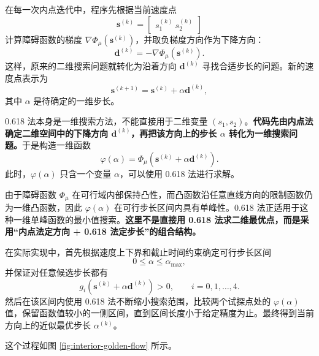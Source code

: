 在每一次内点迭代中，程序先根据当前速度点
\[
	\boldsymbol{s}^{(k)}
	=
	\begin{bmatrix}
		s_1^{(k)}\
		s_2^{(k)}
	\end{bmatrix}
\]
计算障碍函数的梯度 $\nabla \Phi_{\mu}(\boldsymbol{s}^{(k)})$，并取负梯度方向作为下降方向：
\[
	\boldsymbol{d}^{(k)}
	=
	-
	\nabla \Phi_{\mu}(\boldsymbol{s}^{(k)}).
\]
这样，原来的二维搜索问题就转化为沿着方向 $\boldsymbol{d}^{(k)}$ 寻找合适步长的问题。新的速度点表示为
\[
	\boldsymbol{s}^{(k+1)}
	=
	\boldsymbol{s}^{(k)}
	+
	\alpha \boldsymbol{d}^{(k)},
\]
其中 $\alpha$ 是待确定的一维步长。

0.618 法本身是一维搜索方法，不能直接用于二维变量 $(s_1,s_2)$。\textbf{代码先由内点法确定二维空间中的下降方向 $\boldsymbol{d}^{(k)}$，再把该方向上的步长 $\alpha$ 转化为一维搜索问题。}于是构造一维函数
\[
	\varphi(\alpha)
	=
	\Phi_{\mu}
	\left(
	\boldsymbol{s}^{(k)}
	+
	\alpha \boldsymbol{d}^{(k)}
	\right).
\]
此时，$\varphi(\alpha)$ 只含一个变量 $\alpha$，可以使用 0.618 法进行求解。

由于障碍函数 $\Phi_{\mu}$ 在可行域内部保持凸性，而凸函数沿任意直线方向的限制函数仍为一维凸函数，因此 $\varphi(\alpha)$ 在可行步长区间内具有单峰性。0.618 法正适用于这种一维单峰函数的最小值搜索。\textbf{这里不是直接用 0.618 法求二维最优点，而是采用“内点法定方向 + 0.618 法定步长”的组合结构。}

在实际实现中，首先根据速度上下界和截止时间约束确定可行步长区间
\[
	0\leq \alpha \leq \alpha_{\max},
\]
并保证对任意候选步长都有
\[
	g_i
	\left(
	\boldsymbol{s}^{(k)}
	+
	\alpha \boldsymbol{d}^{(k)}
	\right)
	>
	0,
	\qquad i=0,1,\ldots,4.
\]
然后在该区间内使用 0.618 法不断缩小搜索范围，比较两个试探点处的 $\varphi(\alpha)$ 值，保留函数值较小的一侧区间，直到区间长度小于给定精度为止。最终得到当前方向上的近似最优步长 $\alpha^{(k)}$。

这个过程如图 \ref{fig:interior-golden-flow} 所示。

